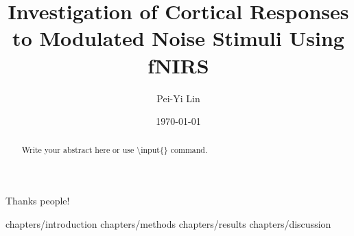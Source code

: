 \documentclass[a4paper, 12pt, twoside]{report}
\author{Pei-Yi Lin}
\title{Investigation of Cortical Responses to Modulated Noise Stimuli Using fNIRS}
\date{\today}
\begin{document}
\maketitle{}


\begin{abstract}
  Write your abstract here or use \textbackslash{}input\{\} command.

  
\end{abstract}
\cleardoublepage{}


\begin{acknowledgments}
Thanks people!
\end{acknowledgments}


% 



\cleardoublepage{}
\tableofcontents
\cleardoublepage{}



%

 {chapters/introduction}
 {chapters/methods}
 {chapters/results}
 {chapters/discussion}


\appendix{}
%


\listoffigures{}
\listoftables{}




\nocite{*}
\cleardoublepage{}


\erklaerung{}
\end{document}
